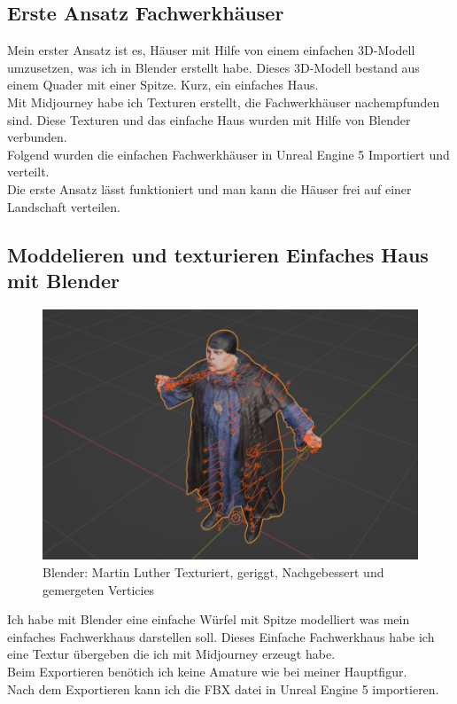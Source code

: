 \subsection{Erste Ansatz Fachwerkhäuser}%
Mein erster Ansatz ist es, Häuser mit Hilfe von einem einfachen 3D-Modell umzusetzen, was ich in Blender erstellt habe. Dieses 3D-Modell bestand aus einem Quader mit einer Spitze. Kurz, ein einfaches Haus.
\\
Mit Midjourney habe ich Texturen erstellt, die Fachwerkhäuser nachempfunden sind. Diese Texturen und das einfache Haus wurden mit Hilfe von Blender verbunden.
\\
Folgend wurden die einfachen Fachwerkhäuser in Unreal Engine 5 Importiert und verteilt.
\\
Die erste Ansatz lässt funktioniert und man kann die Häuser frei auf einer Landschaft verteilen.
\\
\subsection{Moddelieren und texturieren Einfaches Haus mit Blender}

\begin{figure}
	\centering
	\includegraphics[width=14cm]{BilderFuerBA/BlenderMLGeriggtUndTexturiert95k.png}
	\caption{Blender: Martin Luther Texturiert, geriggt, Nachgebessert und gemergeten Verticies}
	\label{BlenderMLGeriggtUndTexturiert95k}
\end{figure}
Ich habe mit Blender eine einfache Würfel mit Spitze modelliert was mein einfaches Fachwerkhaus darstellen soll. Dieses Einfache Fachwerkhaus habe ich eine Textur übergeben die ich mit Midjourney erzeugt habe.
\\
Beim Exportieren benötich ich keine Amature wie bei meiner Hauptfigur.
\\
Nach dem Exportieren kann ich die FBX datei in Unreal Engine 5 importieren.

